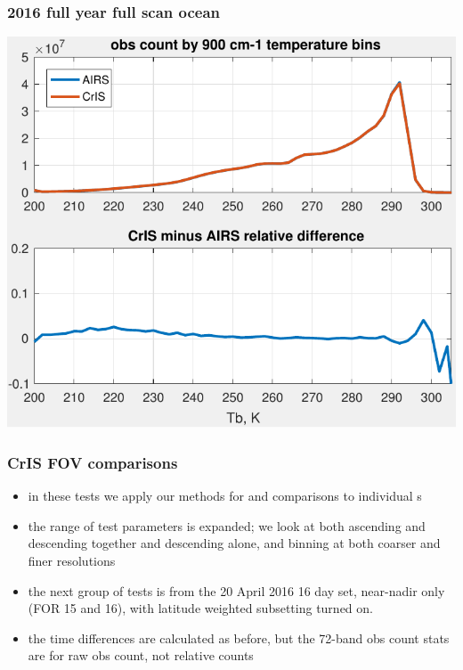 \documentclass[11pt]{beamer}
\begin{document}
\begin{frame}
\frametitle{2016 full year full scan ocean}
\begin{center}
  \includegraphics[scale=0.7]{figures/full-scan_ocean_2016_all.pdf}
\end{center}
\end{frame} %
\begin{frame}
\frametitle{CrIS FOV comparisons}

\begin{itemize}

  \item in these tests we apply our methods for {\airs} and {\cris}
    comparisons to individual {\cris} {\fov}s

  \item the range of test parameters is expanded; we look at both
    ascending and descending together and descending alone, and
    binning at both coarser and finer resolutions

  \item the next group of tests is from the 20 April 2016 16 day
    set, near-nadir only (FOR 15 and 16), with latitude weighted
    subsetting turned on.   

  \item the time differences are calculated as before, but the
    72-band obs count stats are for raw obs count, not relative
    counts 

\end{itemize}

\end{frame}
\end{document}
